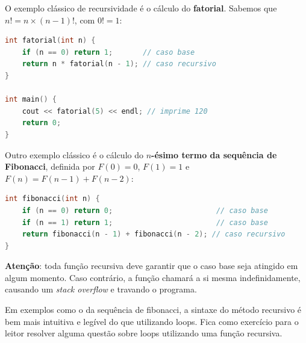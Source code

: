 \documentclass[12pt]{article}
\begin{document}
O exemplo clássico de recursividade é o cálculo do \textbf{fatorial}. Sabemos que $n! = n \times (n-1)!$, com $0! = 1$:

\begin{lstlisting}[language=C++]
int fatorial(int n) {
    if (n == 0) return 1;       // caso base
    return n * fatorial(n - 1); // caso recursivo
}

int main() {
    cout << fatorial(5) << endl; // imprime 120
    return 0;
}
\end{lstlisting}

Outro exemplo clássico é o cálculo do \textbf{$n$-ésimo termo da sequência de Fibonacci}, definida por $F(0) = 0$, $F(1) = 1$ e $F(n) = F(n-1) + F(n-2)$:

\begin{lstlisting}[language=C++]
int fibonacci(int n) {
    if (n == 0) return 0;                        // caso base
    if (n == 1) return 1;                        // caso base
    return fibonacci(n - 1) + fibonacci(n - 2); // caso recursivo
}
\end{lstlisting}

\textbf{Atenção}: toda função recursiva deve garantir que o caso base seja atingido em algum momento. Caso contrário, a função chamará a si mesma indefinidamente, causando um \textit{stack overflow} e travando o programa.\\

\vspace{5mm}

Em exemplos como o da sequência de fibonacci, a sintaxe do método recursivo é bem mais intuitiva e legível do que utilizando loops. Fica como exercício para o leitor resolver alguma questão sobre loops utilizando uma função recursiva.
\end{document}
